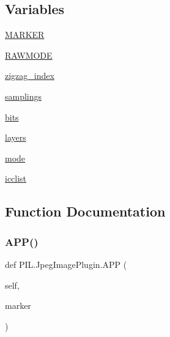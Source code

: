 \subsection*{Variables}
\begin{DoxyCompactItemize}
\item 
\hyperlink{namespacePIL_1_1JpegImagePlugin_aaa297e74a583a9ce9b7fa40f5d629240}{M\+A\+R\+K\+ER}
\item 
\hyperlink{namespacePIL_1_1JpegImagePlugin_acd77687ab0d11f0f364b9392a55b7a24}{R\+A\+W\+M\+O\+DE}
\item 
\hyperlink{namespacePIL_1_1JpegImagePlugin_ac63a68a89f0788d16116611a5c6e9186}{zigzag\+\_\+index}
\item 
\hyperlink{namespacePIL_1_1JpegImagePlugin_ae08f68dd1605e86c6053537b08e4284b}{samplings}
\item 
\hyperlink{namespacePIL_1_1JpegImagePlugin_acfc8adc0e5df82d6c92e3ff83b6321f5}{bits}
\item 
\hyperlink{namespacePIL_1_1JpegImagePlugin_a0f3dc7daa7c66940aff1401d59dd8f2a}{layers}
\item 
\hyperlink{namespacePIL_1_1JpegImagePlugin_a55efcf4f75445996b359eef9f8ade5e6}{mode}
\item 
\hyperlink{namespacePIL_1_1JpegImagePlugin_a649e409f25ad4457e6f6ff6c2c3a5dd8}{icclist}
\end{DoxyCompactItemize}


\subsection{Function Documentation}
\mbox{\label{namespacePIL_1_1JpegImagePlugin_aeec4e557e29bafb45ed9141f44ee9ce2}} 
\subsubsection{\texorpdfstring{A\+P\+P()}{APP()}}
{\footnotesize\ttfamily def P\+I\+L.\+Jpeg\+Image\+Plugin.\+A\+PP (\begin{DoxyParamCaption}\item[{}]{self,  }\item[{}]{marker }\end{DoxyParamCaption})}

\mbox{\label{namespacePIL_1_1JpegImagePlugin_a8753b7fc9fa965f81cebce9b0eee232e}} 
